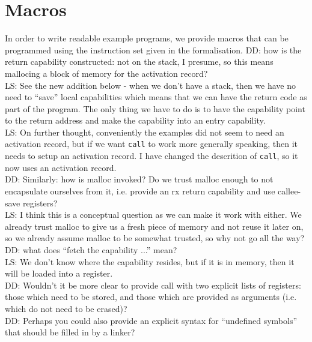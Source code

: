 \documentclass[a4paper]{article}
\newcommand\lau[1]{{\color{purple} \sf \footnotesize {LS: #1}}\\}
\newcommand\dominique[1]{{\color{purple} \sf \footnotesize {DD: #1}}\\}
\begin{document}
\section{Macros}
In order to write readable example programs, we provide macros that can be programmed using the instruction set given in the formalisation.
\dominique{how is the return capability constructed: not on the stack, I presume, so this means mallocing a block of memory for the activation record?}
\lau{See the new addition below - when we don't have a stack, then we have no need to ``save'' local capabilities which means that we can have the return code as part of the program. The only thing we have to do is to have the capability point to the return address and make the capability into an entry capability. }
\lau{On further thought, conveniently the examples did not seem to need an activation record, but if we want \texttt{call} to work more generally speaking, then it needs to setup an activation record. I have changed the descrition of \texttt{call}, so it now uses an activation record. }
\dominique{Similarly: how is malloc invoked?  Do we trust malloc enough to not encapsulate ourselves from it, i.e. provide an rx return capability and use callee-save registers?}
\lau{ I think this is a conceptual question as we can make it work with either. We already trust malloc to give us a fresh piece of memory and not reuse it later on, so we already assume malloc to be somewhat trusted, so why not go all the way? }
\dominique{what does ``fetch the capability ...'' mean?}
\lau{ We don't know where the capability resides, but if it is in memory, then it will be loaded into a register. }
\dominique{Wouldn't it be more clear to provide call with two explicit lists of registers: those which need to be stored, and those which are provided as arguments (i.e. which do not need to be erased)?}
\dominique{Perhaps you could also provide an explicit syntax for ``undefined symbols'' that should be filled in by a linker?}
\end{document}
